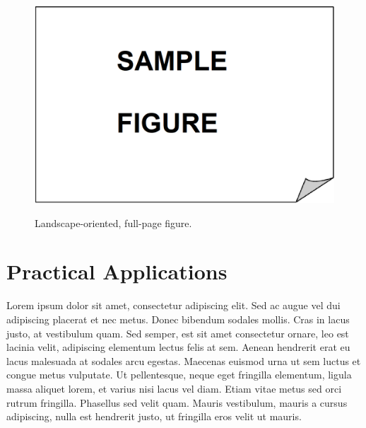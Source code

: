 \begin{landscape}
\thispagestyle{empty}
 \begin{figure}[!ht]
 \vspace{-2mm}
 \centering
 \includegraphics[width=450pt,keepaspectratio=true]{./fig/sekil3}
 \vspace{4mm}
 \caption{Landscape-oriented, full-page figure.}    
      \vspace{40mm} %
      \hspace{0cm}\pageref{fig:landscape_figure}   %
      \label{fig:landscape_figure}
\end{figure}
\end{landscape}

\section{Practical Applications}

Lorem ipsum dolor sit amet, consectetur adipiscing elit. Sed ac augue vel dui 
adipiscing placerat et nec metus. Donec bibendum sodales mollis. Cras in lacus 
justo, at vestibulum quam. Sed semper, est sit amet consectetur ornare, leo est 
lacinia velit, adipiscing elementum lectus felis at sem. Aenean hendrerit erat eu 
lacus malesuada at sodales arcu egestas. Maecenas euismod urna ut sem luctus et 
congue metus vulputate. Ut pellentesque, neque eget fringilla elementum, ligula 
massa aliquet lorem, et varius nisi lacus vel diam. Etiam vitae metus sed orci 
rutrum fringilla. Phasellus sed velit quam. Mauris vestibulum, mauris a cursus 
adipiscing, nulla est hendrerit justo, ut fringilla eros velit ut mauris.

